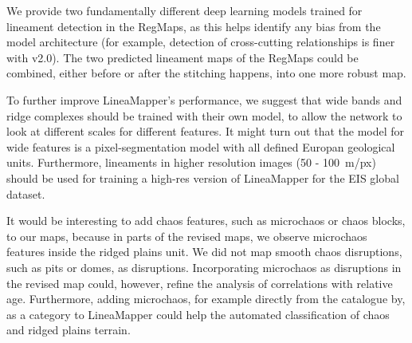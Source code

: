 We provide two fundamentally different deep learning models trained for lineament detection in the RegMaps, as this helps identify any bias from the model architecture (for example, detection of cross-cutting relationships is finer with v2.0). The two predicted lineament maps of the RegMaps could be combined, either before or after the stitching happens, into one more robust map.


To further improve LineaMapper's performance, we suggest that wide bands and ridge complexes should be trained with their own model, to allow the network to look at different scales for different features. It might turn out that the model for wide features is a pixel-segmentation model with all defined Europan geological units.
Furthermore, lineaments in higher resolution images (50 - 100~m/px) should be used for training a high-res version of LineaMapper for the EIS global dataset.

It would be interesting to add chaos features, such as microchaos or chaos blocks, to our maps, because in parts of the revised maps, we observe microchaos features inside the ridged plains unit. We did not map smooth chaos disruptions, such as pits or domes, as disruptions. Incorporating microchaos as disruptions in the revised map could, however, refine the analysis of correlations with relative age. Furthermore, adding microchaos, for example directly from the catalogue by, as a category to LineaMapper could help the automated classification of chaos and ridged plains terrain.



